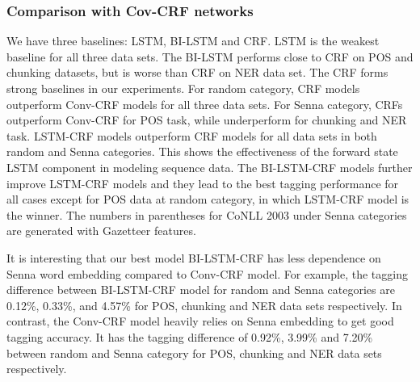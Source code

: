 \documentclass[11pt,a4paper]{article}
\begin{document}
\subsubsection{Comparison with Cov-CRF networks}
We have three baselines: LSTM, BI-LSTM and CRF. LSTM is the weakest baseline for all three data sets. The BI-LSTM performs close to CRF on POS and chunking datasets, but is worse than CRF on NER data set. The CRF forms strong baselines in our experiments. For random category,  CRF models outperform Conv-CRF models for all three data sets. For Senna category, CRFs outperform Conv-CRF for POS task, while underperform for chunking and NER task. LSTM-CRF models outperform CRF models for all data sets in both random and Senna categories. This shows the effectiveness of the forward state LSTM component in modeling sequence data. The BI-LSTM-CRF models further improve LSTM-CRF models and they lead to the best tagging performance for all cases except for POS data at random category, in which LSTM-CRF model is the winner. The numbers in parentheses for CoNLL 2003 under Senna categories are generated with Gazetteer features. 

It is interesting that our best model BI-LSTM-CRF has less dependence on Senna word embedding compared to Conv-CRF model. For example, the tagging difference between BI-LSTM-CRF model for random and Senna categories are 0.12\%, 0.33\%, and 4.57\% for POS, chunking and NER data sets respectively. In contrast, the Conv-CRF model heavily relies on Senna embedding to get good tagging accuracy. It has the tagging difference of 0.92\%, 3.99\% and 7.20\% between random and Senna category for POS, chunking and NER data sets respectively.
\end{document}
